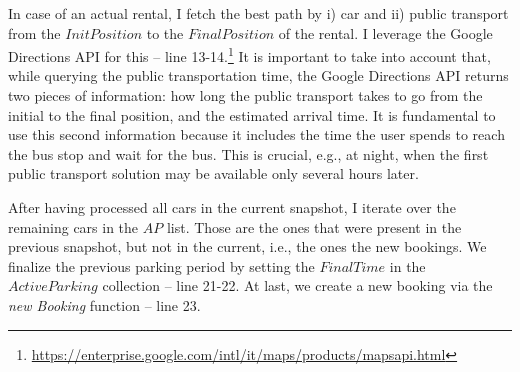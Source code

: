 In case of an actual rental, I fetch the best path by i) car and ii) public transport from the  $InitPosition$ to the $FinalPosition$ of the rental. I leverage the Google Directions API for this -- line 13-14.\footnote{\url{https://enterprise.google.com/intl/it/maps/products/mapsapi.html}}
It is important to take into account that, while querying the public transportation time, the Google Directions API returns two pieces of information: how long the public transport takes to go from the initial to the final position, and the estimated arrival time. It is fundamental to use this second information because  it includes the time the user spends to reach the bus stop and wait for the bus. This is crucial, e.g., at night, when the first public transport solution may be available only several hours later.

After having processed all cars in the current snapshot, I iterate over the remaining cars in the $AP$ list. Those are the ones that were present in the previous snapshot, but not in the current, i.e., the ones the new bookings. We finalize the previous parking period by setting the $FinalTime$ in the $ActiveParking$ collection -- line 21-22. At last, we create a new booking via the \textit{new Booking} function -- line 23.


